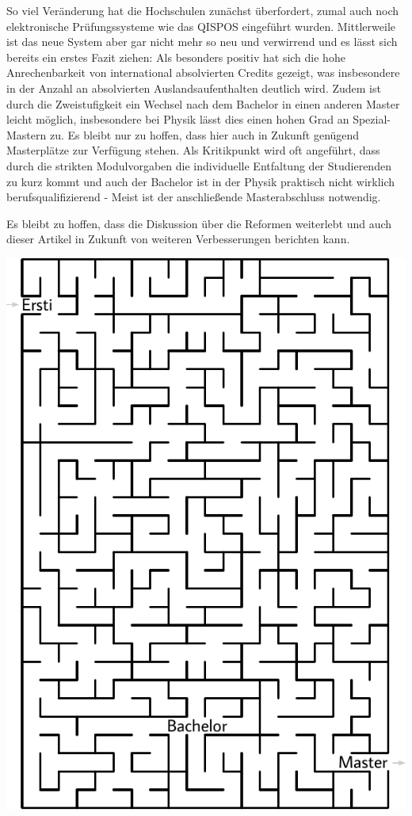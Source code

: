 \begin{multicols}{2}
So viel Veränderung hat die Hochschulen zunächst überfordert, zumal auch noch elektronische Prüfungssysteme wie das QISPOS eingeführt wurden. Mittlerweile ist das neue System aber gar nicht mehr so neu und verwirrend und es lässt sich bereits ein erstes Fazit ziehen:
Als besonders positiv hat sich die hohe Anrechenbarkeit von international absolvierten Credits gezeigt, was insbesondere in der Anzahl an absolvierten Auslandsaufenthalten deutlich wird. Zudem ist durch die Zweistufigkeit ein Wechsel nach dem Bachelor in einen anderen Master leicht möglich, insbesondere bei Physik lässt dies einen hohen Grad an Spezial-Mastern zu.
Es bleibt nur zu hoffen, dass hier auch in Zukunft genügend Masterplätze zur Verfügung stehen.
Als Kritikpunkt wird oft angeführt, dass durch die strikten Modulvorgaben die individuelle Entfaltung der Studierenden zu kurz kommt und auch der Bachelor ist in der Physik praktisch nicht wirklich berufsqualifizierend - Meist ist der anschließende Masterabschluss notwendig.

Es bleibt zu hoffen, dass die Diskussion über die Reformen weiterlebt und auch dieser Artikel in Zukunft von weiteren Verbesserungen berichten kann.

\end{multicols}

\begin{center}
	\includegraphics[width=\textwidth, height=0.38\textheight]{res/bachelor_master_labyrinth.pdf}
\end{center}
